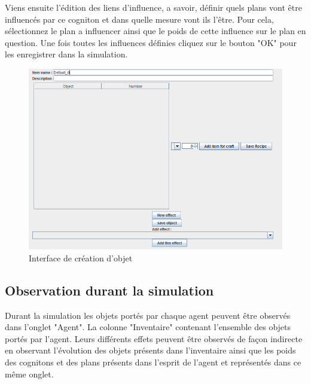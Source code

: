 Viens ensuite l'édition des liens d'influence, a savoir, définir quels plans vont être influencés par ce cogniton et dans quelle mesure vont ils l'être. Pour cela, sélectionnez le plan a influencer ainsi que le poids de cette influence sur le plan en question. Une fois toutes les influences définies cliquez sur le bouton "OK" pour les enregistrer dans la simulation.

\begin{figure}[!h]
\begin{center}
\includegraphics[scale = 0.7]{images/ecran.png}
\caption[eff]{Interface de création d'objet \\}
\label{Interface de création d'objet}
\end{center}
\end{figure}



\subsection{Observation durant la simulation}

Durant la simulation les objets portés par chaque agent peuvent être observés dans l'onglet "Agent". La colonne "Inventaire" contenant l'ensemble des objets portés par l'agent. Leurs différents effets peuvent être observés de façon indirecte en observant l'évolution des objets présents dans l'inventaire ainsi que les poids des cognitons et des plans présents dans l'esprit de l'agent et représentés dans ce même onglet.